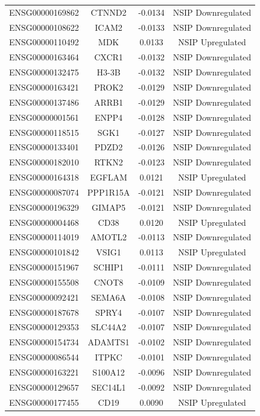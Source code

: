 \documentclass[
]{article}
\begin{document}
\begin{singlespace}
\begin{longtable}[t]{lccc}
ENSG00000169862 & CTNND2 & -0.0134 & NSIP Downregulated\\
ENSG00000108622 & ICAM2 & -0.0133 & NSIP Downregulated\\
ENSG00000110492 & MDK & 0.0133 & NSIP Upregulated\\
ENSG00000163464 & CXCR1 & -0.0132 & NSIP Downregulated\\
\addlinespace
ENSG00000132475 & H3-3B & -0.0132 & NSIP Downregulated\\
ENSG00000163421 & PROK2 & -0.0129 & NSIP Downregulated\\
ENSG00000137486 & ARRB1 & -0.0129 & NSIP Downregulated\\
ENSG00000001561 & ENPP4 & -0.0128 & NSIP Downregulated\\
ENSG00000118515 & SGK1 & -0.0127 & NSIP Downregulated\\
\addlinespace
ENSG00000133401 & PDZD2 & -0.0126 & NSIP Downregulated\\
ENSG00000182010 & RTKN2 & -0.0123 & NSIP Downregulated\\
ENSG00000164318 & EGFLAM & 0.0121 & NSIP Upregulated\\
ENSG00000087074 & PPP1R15A & -0.0121 & NSIP Downregulated\\
ENSG00000196329 & GIMAP5 & -0.0121 & NSIP Downregulated\\
\addlinespace
ENSG00000004468 & CD38 & 0.0120 & NSIP Upregulated\\
ENSG00000114019 & AMOTL2 & -0.0113 & NSIP Downregulated\\
ENSG00000101842 & VSIG1 & 0.0113 & NSIP Upregulated\\
ENSG00000151967 & SCHIP1 & -0.0111 & NSIP Downregulated\\
ENSG00000155508 & CNOT8 & -0.0109 & NSIP Downregulated\\
\addlinespace
ENSG00000092421 & SEMA6A & -0.0108 & NSIP Downregulated\\
ENSG00000187678 & SPRY4 & -0.0107 & NSIP Downregulated\\
ENSG00000129353 & SLC44A2 & -0.0107 & NSIP Downregulated\\
ENSG00000154734 & ADAMTS1 & -0.0102 & NSIP Downregulated\\
ENSG00000086544 & ITPKC & -0.0101 & NSIP Downregulated\\
\addlinespace
ENSG00000163221 & S100A12 & -0.0096 & NSIP Downregulated\\
ENSG00000129657 & SEC14L1 & -0.0092 & NSIP Downregulated\\
ENSG00000177455 & CD19 & 0.0090 & NSIP Upregulated\\

\end{longtable}
\end{singlespace}
\end{document}
